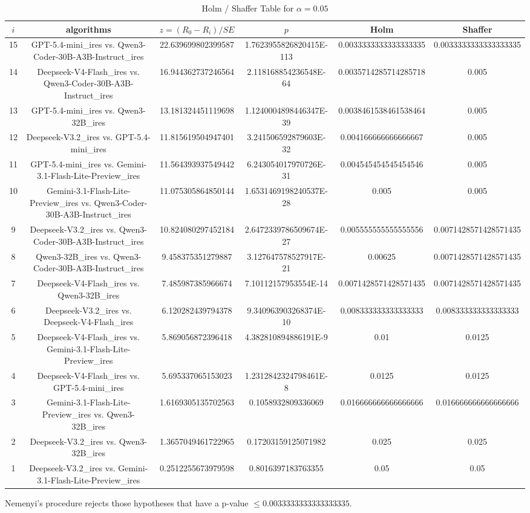 \documentclass[a4paper,10pt]{article}
\begin{document}
\begin{landscape}
\begin{table}[!htp]
\centering\tiny
\caption{Holm / Shaffer Table for $\alpha=0.05$}
\begin{tabular}{cccccc}
$i$&algorithms&$z=(R_0 - R_i)/SE$&$p$&Holm&Shaffer\\
\hline
15&GPT-5.4-mini_ires vs. Qwen3-Coder-30B-A3B-Instruct_ires&22.639699802399587&1.7623955826820415E-113&0.0033333333333333335&0.0033333333333333335\\14&Deepseek-V4-Flash_ires vs. Qwen3-Coder-30B-A3B-Instruct_ires&16.944362737246564&2.118168854236548E-64&0.0035714285714285718&0.005\\13&GPT-5.4-mini_ires vs. Qwen3-32B_ires&13.181324451119698&1.1240004898446347E-39&0.0038461538461538464&0.005\\12&Deepseek-V3.2_ires vs. GPT-5.4-mini_ires&11.815619504947401&3.241506592879603E-32&0.004166666666666667&0.005\\11&GPT-5.4-mini_ires vs. Gemini-3.1-Flash-Lite-Preview_ires&11.564393937549442&6.243054017970726E-31&0.004545454545454546&0.005\\10&Gemini-3.1-Flash-Lite-Preview_ires vs. Qwen3-Coder-30B-A3B-Instruct_ires&11.075305864850144&1.6531469198240537E-28&0.005&0.005\\9&Deepseek-V3.2_ires vs. Qwen3-Coder-30B-A3B-Instruct_ires&10.824080297452184&2.6472339786509674E-27&0.005555555555555556&0.0071428571428571435\\8&Qwen3-32B_ires vs. Qwen3-Coder-30B-A3B-Instruct_ires&9.458375351279887&3.127647578527917E-21&0.00625&0.0071428571428571435\\7&Deepseek-V4-Flash_ires vs. Qwen3-32B_ires&7.485987385966674&7.10112157953554E-14&0.0071428571428571435&0.0071428571428571435\\6&Deepseek-V3.2_ires vs. Deepseek-V4-Flash_ires&6.120282439794378&9.340963903268374E-10&0.008333333333333333&0.008333333333333333\\5&Deepseek-V4-Flash_ires vs. Gemini-3.1-Flash-Lite-Preview_ires&5.869056872396418&4.382810894886191E-9&0.01&0.0125\\4&Deepseek-V4-Flash_ires vs. GPT-5.4-mini_ires&5.695337065153023&1.2312842324798461E-8&0.0125&0.0125\\3&Gemini-3.1-Flash-Lite-Preview_ires vs. Qwen3-32B_ires&1.6169305135702563&0.1058932809336069&0.016666666666666666&0.016666666666666666\\2&Deepseek-V3.2_ires vs. Qwen3-32B_ires&1.3657049461722965&0.17203159125071982&0.025&0.025\\1&Deepseek-V3.2_ires vs. Gemini-3.1-Flash-Lite-Preview_ires&0.2512255673979598&0.8016397183763355&0.05&0.05\\\hline
\end{tabular}
\end{table}
Nemenyi's procedure rejects those hypotheses that have a p-value $\le0.0033333333333333335$.



\end{landscape}
\end{document}
